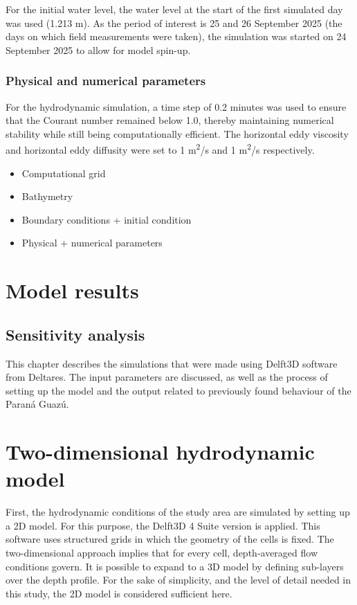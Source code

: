 For the initial water level, the water level at the start of the first simulated day was used (1.213 m). As the period of interest is 25 and 26 September 2025 (the days on which field measurements were taken), the simulation was started on 24 September 2025 to allow for model spin-up.

\subsubsection{Physical and numerical parameters}
For the hydrodynamic simulation, a time step of 0.2 minutes was used to ensure that the Courant number remained below 1.0, thereby maintaining numerical stability while still being computationally efficient. The horizontal eddy viscosity and horizontal eddy diffusity were set to 1 m\textsuperscript{2}/s and 1 m\textsuperscript{2}/s respectively. 


\begin{itemize}
    \item Computational grid
    \item Bathymetry
    \item Boundary conditions + initial condition
    \item Physical + numerical parameters
\end{itemize}

\section{Model results}

\subsection{Sensitivity analysis}



This chapter describes the simulations that were made using Delft3D software from Deltares. The input parameters are discussed, as well as the process of setting up the model and the output related to previously found behaviour of the Paraná Guazú. 

\section{Two-dimensional hydrodynamic model}
First, the hydrodynamic conditions of the study area are simulated by setting up a 2D model. For this purpose, the Delft3D 4 Suite version is applied. This software uses structured grids in which the geometry of the cells is fixed. The two-dimensional approach implies that for every cell, depth-averaged flow conditions govern. It is possible to expand to a 3D model by defining sub-layers over the depth profile. For the sake of simplicity, and the level of detail needed in this study, the 2D model is considered sufficient here. 

